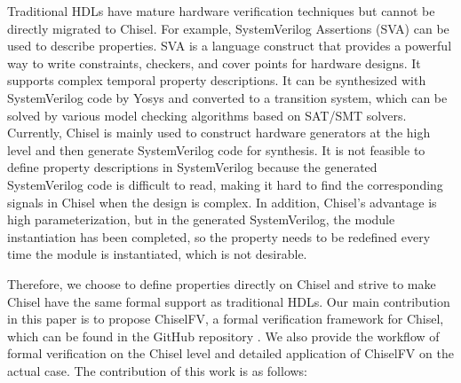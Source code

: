 \documentclass[conference]{IEEEtran}
\theoremstyle{definition}
\begin{document}
Traditional HDLs have mature hardware verification techniques but cannot be directly migrated to Chisel.
For example, SystemVerilog Assertions (SVA) \cite{vijayaraghavan2005practical} can be used to describe properties. SVA is a language construct that provides a powerful way to write constraints, checkers, and cover points for hardware designs. It supports complex temporal property descriptions. It can be synthesized with SystemVerilog code by Yosys \cite{wolf2016yosys} and converted to a transition system, which can be solved by various model checking algorithms based on SAT/SMT solvers.
Currently, Chisel is mainly used to construct hardware generators at the high level and then generate SystemVerilog code for synthesis. It is not feasible to define property descriptions in SystemVerilog because the generated SystemVerilog code is difficult to read, making it hard to find the corresponding signals in Chisel when the design is complex. In addition, Chisel's advantage is high parameterization, but in the generated SystemVerilog, the module instantiation has been completed, so the property needs to be redefined every time the module is instantiated, which is not desirable.

Therefore, we choose to define properties directly on Chisel and strive to make Chisel have the same formal support as traditional HDLs. 
Our main contribution in this paper is to propose ChiselFV, a formal verification framework for Chisel, which can be found in the GitHub repository \cite{ChiselFV}.
We also provide the workflow of formal verification on the Chisel level and detailed application of ChiselFV on the actual case. The contribution of this work is as follows:
\end{document}
